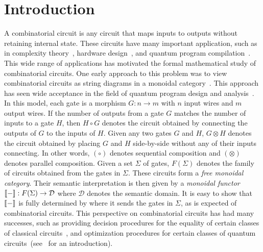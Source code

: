\section{Introduction}

A combinatorial circuit is any circuit that maps inputs to outputs without retaining internal state.
These circuits have many important application, such as in complexity theory~\cite{Vollmer1982}, hardware design~\cite{HarrisWeste2010}, and quantum program compilation~\cite{CrossJavadiAbhari2022}.
This wide range of applications has motivated the formal mathematical study of combinatorial circuits.
One early approach to this problem was to view combinatorial circuits as string diagrams in a monoidal category~\cite{Hotz1965}.
This approach has seen wide acceptance in the field of quantum program design and analysis~\cite{HeunenVicary2019}.
In this model, each gate is a morphism $G: n \to m$ with $n$ input wires and $m$ output wires.
If the number of outputs from a gate $G$ matches the number of inputs to a gate $H$, then $H \circ G$ denotes the circuit obtained by connecting the outputs of $G$ to the inputs of $H$.
Given any two gates $G$ and $H$, $G \otimes H$ denotes the circuit obtained by placing $G$ and $H$ side-by-side without any of their inputs connecting.
In other words, $( \circ )$ denotes sequential composition and $( \otimes )$ denotes parallel composition.
Given a set $\Sigma$ of gates, $F( \Sigma )$ denotes the family of circuits obtained from the gates in $\Sigma$.
These circuits form a \emph{free monoidal category}.
Their semantic interpretation is then given by a \emph{monoidal functor} $\llbracket-\rrbracket: F( \Sigma ) \to \mathcal{D}$ where $\mathcal{D}$ denotes the semantic domain.
It is easy to show that $\llbracket-\rrbracket$ is fully determined by where it sends the gates in $\Sigma$, as is expected of combinatorial circuits.
This perspective on combinatorial circuits has had many successes, such as providing decision procedures for the equality of certain classes of classical circuits~\cite{Lafont2003}, and optimization procedures for certain classes of quantum circuits~(see~\cite{Backens2021} for an introduction).


